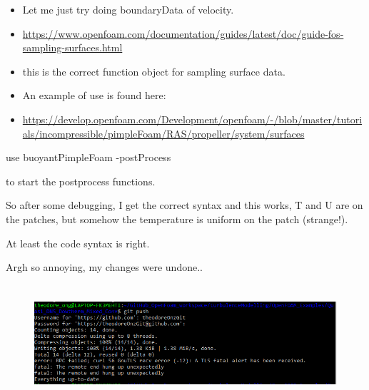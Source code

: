 \documentclass[12pt]{article}
\renewcommand{\_}{\kern-1.5pt\textunderscore\kern-1.5pt}
\begin{document}
\vspace{\baselineskip}
\begin{itemize}
	\item Let me just try doing boundaryData of velocity.\par

	\item \href{https://www.openfoam.com/documentation/guides/latest/doc/guide-fos-sampling-surfaces.html}{https://www.openfoam.com/documentation/guides/latest/doc/guide-fos-sampling-surfaces.html}\par

	\item this is the correct function object for sampling surface data.\par


\vspace{\baselineskip}
	\item An example of use is found here:\par

	\item \href{https://develop.openfoam.com/Development/openfoam/-/blob/master/tutorials/incompressible/pimpleFoam/RAS/propeller/system/surfaces}{https://develop.openfoam.com/Development/openfoam/-/blob/master/tutorials/incompressible/pimpleFoam/RAS/propeller/system/surfaces}
\end{itemize}\par


\vspace{\baselineskip}
use buoyantPimpleFoam -postProcess\par

to start the postprocess functions.\par

So after some debugging, I get the correct syntax and this works, T and U are on the patches, but somehow the temperature is uniform on the patch (strange!).\par

At least the code syntax is right.\par

Argh so annoying, my changes were undone..\par




\begin{figure}[H]
	\begin{Center}
		\includegraphics[width=6.27in,height=1.72in]{./media/image28.png}
	\end{Center}
\end{figure}
\end{document}
